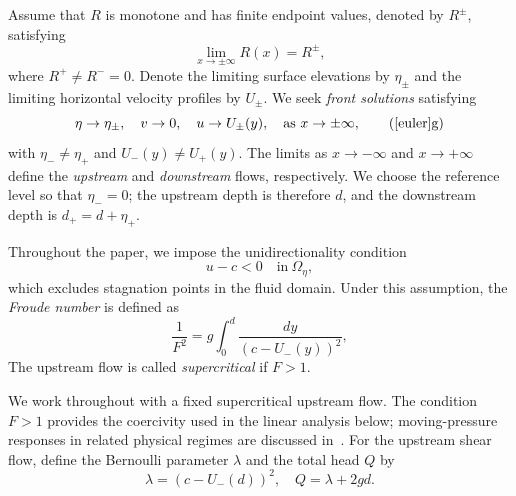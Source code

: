 \documentclass[12pt,letterpaper]{amsart}
\numberwithin{equation}{section}
\begin{document}
	{Assume that $R$ is monotone and has finite endpoint values, denoted by $R^\pm$, satisfying}
	\begin{equation*}
		\lim_{x\to\pm\infty}R(x)=R^{\pm},
	\end{equation*}
	{where $R^+\ne R^-=0$. Denote the limiting surface elevations by $\eta_\pm$ and the limiting horizontal velocity profiles by $U_\pm$. We seek \emph{front solutions} satisfying}
	\begin{equation}
		\eta\to\eta_{\pm},\quad v\to 0,\quad u\to U_{\pm}(y),\quad \mathrm{as~}x\to\pm\infty,\tag{\ref{euler}{g}}\label{eulerasy}
	\end{equation}
	with $\eta_-\not=\eta_+$ and $U_-(y)\not=U_+(y)$. {The limits as $x\to-\infty$ and $x\to+\infty$ define the \emph{upstream} and \emph{downstream} flows, respectively. We choose the reference level so that $\eta_-=0$; the upstream depth is therefore $d$, and the downstream depth is $d_+=d+\eta_+$.}
	
	
	
	
	
	
	
	 {Throughout the paper, we impose the unidirectionality condition}
	\begin{equation*}
		u-c<0\quad\mathrm{in~}\Omega_\eta,
	\end{equation*}
	{which excludes stagnation points in the fluid domain. Under this assumption, the} \emph{Froude number} is defined as
	\begin{equation*}
		\frac{1}{F^2}=g\int_{0}^{d}\frac{dy}{(c-U_-(y))^2},
	\end{equation*}
{The upstream flow is called \emph{supercritical} if $F>1$.}	
	
	
	
	
	
	{We work throughout with a fixed supercritical upstream flow. The condition $F>1$ provides the coercivity used in the linear analysis below; moving-pressure responses in related physical regimes are discussed in~\cite{liujfm}.}
	{For the upstream shear flow, define the Bernoulli parameter $\lambda$ and the total head $Q$ by}
	\begin{equation}\label{upbernoulli}
	\lambda=(c-U_-(d))^2,\quad Q=\lambda+2gd.
	\end{equation}
	
	
	
	
	
	
	
\end{document}
